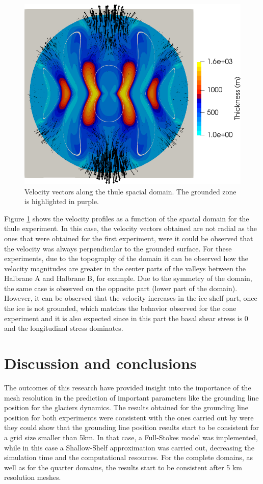\documentclass{article}
\begin{document}
\begin{figure}[!h]
	\centering
	\includegraphics[width=0.6\linewidth]{../fig/H_EXP3_colorfull_noProfiles.png}
	\caption{Velocity vectors along the thule spacial domain. The grounded zone is highlighted in purple.}
	\label{SSA_velocity_thule}
\end{figure}

Figure \ref{SSA_velocity_thule} shows the velocity profiles as a function of the spacial domain for the thule experiment. In this case, the velocity vectors obtained are not radial as the ones that were obtained for the first experiment, were it could be observed that the velocity was always perpendicular to the grounded surface. For these experiments, due to the topography of the domain it can be observed how the velocity magnitudes are greater in the center parts of the valleys between the Halbrane A and Halbrane B, for example. Due to the symmetry of the domain, the same case is observed on the opposite part (lower part of the domain). However, it can be observed that the velocity increases in the ice shelf part, once the ice is not grounded, which matches the behavior observed for the cone experiment and it is also expected since in this part the basal shear stress is 0 and the longitudinal stress dominates. 

\section{Discussion and conclusions}

The outcomes of this research have provided insight into the importance of the mesh resolution in the prediction of important parameters like the grounding line position for the glaciers dynamics. The results obtained for the grounding line position for both experiments were consistent with the ones carried out by \cite{durand2009full} were they could show that the grounding line position results start to be consistent for a grid size smaller than 5km. In that case, a Full-Stokes model was implemented, while in this case a Shallow-Shelf approximation was carried out, decreasing the simulation time and the computational resources. For the complete domains, as well as for the quarter domains, the results start to be consistent after 5 km resolution meshes. 
\end{document}
